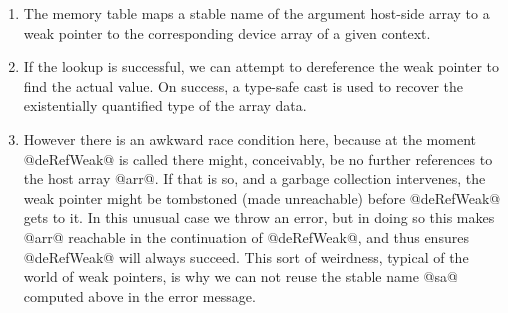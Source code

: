%
\begin{enumerate}
\item The memory table maps a stable name of the argument host-side array to a
    weak pointer to the corresponding device array of a given context.

\item If the lookup is successful, we can attempt to dereference the weak
    pointer to find the actual value. On success, a type-safe cast is used to
    recover the existentially quantified type of the array data.

\item However there is an awkward race condition here, because at the moment
    @deRefWeak@ is called there might, conceivably, be no further
    references to the host array @arr@. If that is so, and a garbage
    collection intervenes, the weak pointer might be tombstoned (made
    unreachable) before @deRefWeak@ gets to it. In this unusual case we
    throw an error, but in doing so this makes @arr@ reachable in the
    continuation of @deRefWeak@, and thus ensures @deRefWeak@ will
    always succeed. This sort of weirdness, typical of the world of weak
    pointers, is why we can not reuse the stable name @sa@ computed above
    in the error message.
\end{enumerate}

